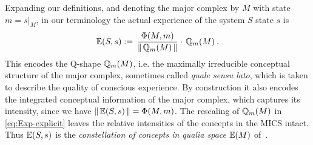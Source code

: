 Expanding our definitions, and denoting the major complex by $M$ with state $m=s|_M$,
in our terminology the actual experience of the system $S$ state $s$ is 
\begin{equation} \label{eq:Exp-explicit}
\mathbb{E}(S,s) := \, \frac{\Phi(M,m)}{ \operatorname{| \hspace*{-0.1em}|} \mathbb{Q}_{m}(M) \operatorname{| \hspace*{-0.1em}|} } \cdot \, \mathbb{Q}_{m}(M) \:.
\end{equation}
This encodes the Q-shape $\mathbb{Q}_{m}(M)$, i.e. the maximally irreducible conceptual structure of the major complex, sometimes called \emph{quale sensu lato}, which is taken to describe the quality of conscious experience. By construction it also encodes the integrated conceptual information of the major complex, which captures its intensity, since we have $\operatorname{| \hspace*{-0.1em}|} \mathbb{E}(S,s)\operatorname{| \hspace*{-0.1em}|} = \Phi(M,m)$. The rescaling of $\mathbb{Q}_{m}(M)$ in \eqref{eq:Exp-explicit} leaves the relative intensities of the concepts in the MICS intact. Thus $\mathbb{E}(S,s)$ is the \emph{constellation of concepts in qualia space} $\mathbb{E}(M)$ of~\cite{oizumi2014phenomenology}.
 

\vfill






